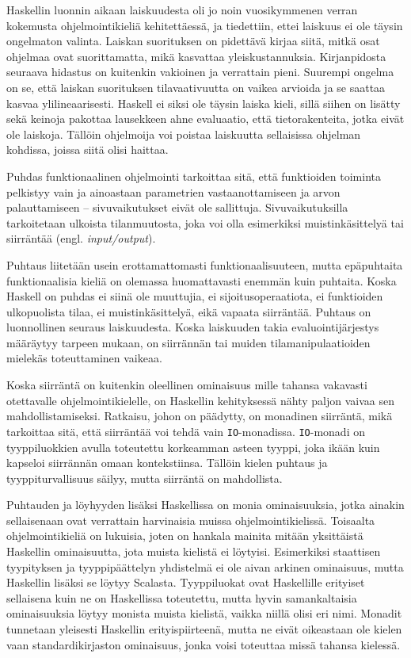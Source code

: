 \documentclass[finnish]{tktltiki2}
\newcommand{\code}[1]{\texttt{#1}}
\begin{document}
Haskellin luonnin aikaan laiskuudesta oli jo noin vuosikymmenen verran kokemusta ohjelmointikieliä
kehitettäessä, ja tiedettiin, ettei laiskuus ei ole täysin ongelmaton valinta. Laiskan suorituksen
on pidettävä kirjaa siitä, mitkä osat ohjelmaa ovat suorittamatta, mikä kasvattaa yleiskustannuksia.
Kirjanpidosta seuraava hidastus on kuitenkin vakioinen ja verrattain pieni. Suurempi ongelma on se,
että laiskan suorituksen tilavaativuutta on vaikea arvioida ja se saattaa kasvaa ylilineaarisesti.
Haskell ei siksi ole täysin laiska kieli, sillä siihen on lisätty sekä keinoja pakottaa lausekkeen
ahne evaluaatio, että tietorakenteita, jotka eivät ole laiskoja. Tällöin ohjelmoija voi poistaa
laiskuutta sellaisissa ohjelman kohdissa, joissa siitä olisi haittaa.

%

Puhdas funktionaalinen ohjelmointi tarkoittaa sitä, että funktioiden toiminta pelkistyy vain ja
ainoastaan parametrien vastaanottamiseen ja arvon palauttamiseen -- sivuvaikutukset eivät ole
sallittuja. Sivuvaikutuksilla tarkoitetaan ulkoista tilanmuutosta, joka voi olla esimerkiksi
muistinkäsittelyä tai siirräntää (engl. \emph{input/output}).

Puhtaus liitetään usein erottamattomasti funktionaalisuuteen, mutta epäpuhtaita funktionaalisia
kieliä on olemassa huomattavasti enemmän kuin puhtaita. Koska Haskell on puhdas ei siinä ole
muuttujia, ei sijoitusoperaatiota, ei funktioiden ulkopuolista tilaa, ei muistinkäsittelyä, eikä
vapaata siirräntää. Puhtaus on luonnollinen seuraus laiskuudesta. Koska laiskuuden takia
evaluointijärjestys määräytyy tarpeen mukaan, on siirrännän tai muiden tilamanipulaatioiden mielekäs
toteuttaminen vaikeaa.

Koska siirräntä on kuitenkin oleellinen ominaisuus mille tahansa vakavasti otettavalle
ohjelmointikielelle, on Haskellin kehityksessä nähty paljon vaivaa sen mahdollistamiseksi. Ratkaisu,
johon on päädytty, on monadinen siirräntä, mikä tarkoittaa sitä, että siirräntää voi tehdä vain
\code{IO}-monadissa. \code{IO}-monadi on tyyppiluokkien avulla toteutettu korkeamman asteen tyyppi,
joka ikään kuin kapseloi siirrännän omaan kontekstiinsa. Tällöin kielen puhtaus ja
tyyppiturvallisuus säilyy, mutta siirräntä on mahdollista.

%

Puhtauden ja löyhyyden lisäksi Haskellissa on monia ominaisuuksia, jotka ainakin sellaisenaan ovat
verrattain harvinaisia muissa ohjelmointikielissä. Toisaalta ohjelmointikieliä on lukuisia, joten on
hankala mainita mitään yksittäistä Haskellin ominaisuutta, jota muista kielistä ei löytyisi.
Esimerkiksi staattisen tyypityksen ja tyyppipäättelyn yhdistelmä ei ole aivan arkinen ominaisuus,
mutta Haskellin lisäksi se löytyy Scalasta. Tyyppiluokat ovat Haskellille erityiset sellaisena kuin
ne on Haskellissa toteutettu, mutta hyvin samankaltaisia ominaisuuksia löytyy monista muista
kielistä, vaikka niillä olisi eri nimi. Monadit tunnetaan yleisesti Haskellin erityispiirteenä,
mutta ne eivät oikeastaan ole kielen vaan standardikirjaston ominaisuus, jonka voisi toteuttaa missä
tahansa kielessä.
\end{document}
